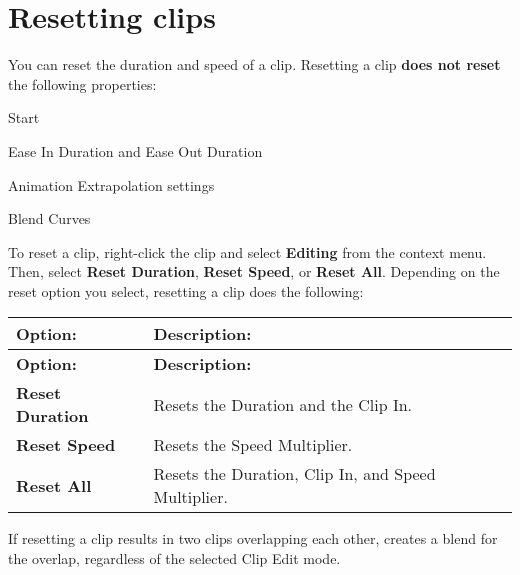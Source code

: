 \chapter{Resetting clips}
\hypertarget{md__hey_tea_9_2_library_2_package_cache_2com_8unity_8timeline_0d1_87_85_2_documentation_0i_2clp__reset}{}\label{md__hey_tea_9_2_library_2_package_cache_2com_8unity_8timeline_0d1_87_85_2_documentation_0i_2clp__reset}
\label{md__hey_tea_9_2_library_2_package_cache_2com_8unity_8timeline_0d1_87_85_2_documentation_0i_2clp__reset_autotoc_md4624}%
%
 You can reset the duration and speed of a clip. Resetting a clip {\bfseries{does not reset}} the following properties\+:


\begin{DoxyItemize}
\item Start
\item Ease In Duration and Ease Out Duration
\item Animation Extrapolation settings
\item Blend Curves
\end{DoxyItemize}

To reset a clip, right-\/click the clip and select {\bfseries{Editing}} from the context menu. Then, select {\bfseries{Reset Duration}}, {\bfseries{Reset Speed}}, or {\bfseries{Reset All}}. Depending on the reset option you select, resetting a clip does the following\+:

\tabulinesep=1mm
\begin{longtabu}spread 0pt [c]{*{2}{|X[-1]}|}
\hline
\cellcolor{\tableheadbgcolor}\textbf{ {\bfseries{Option\+:}}   }&\cellcolor{\tableheadbgcolor}\textbf{ {\bfseries{Description\+:}}    }\\
\endfirsthead
\hline
\endfoot
\hline
\cellcolor{\tableheadbgcolor}\textbf{ {\bfseries{Option\+:}}   }&\cellcolor{\tableheadbgcolor}\textbf{ {\bfseries{Description\+:}}    }\\
\endhead
{\bfseries{Reset Duration}}   &Resets the Duration and the Clip In.    \\
{\bfseries{Reset Speed}}   &Resets the Speed Multiplier.    \\
{\bfseries{Reset All}}   &Resets the Duration, Clip In, and Speed Multiplier.   \\
\end{longtabu}


If resetting a clip results in two clips overlapping each other,  creates a blend for the overlap, regardless of the selected Clip Edit mode. 